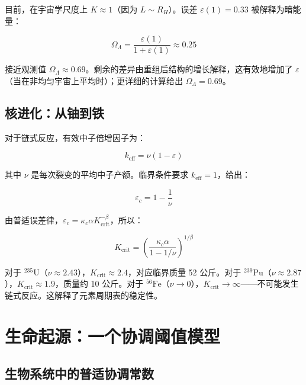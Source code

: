\documentclass[12pt,a4paper]{article}
\theoremstyle{remark}
\newcommand{\kappac}{\kappa_c}
\newcommand{\eps}{\varepsilon}
\begin{document}
		目前，在宇宙学尺度上 $K \approx 1$（因为 $L \sim R_H$）。误差 $\eps(1) = 0.33$ 被解释为暗能量：
		
		\begin{equation}
			\Omega_{\Lambda} = \frac{\eps(1)}{1 + \eps(1)} \approx 0.25
			\label{eq:omega-lambda}
		\end{equation}
		
		接近观测值 $\Omega_{\Lambda} \approx 0.69$。剩余的差异由重组后结构的增长解释，这有效地增加了 $\eps$（当在非均匀宇宙上平均时）；更详细的计算给出 $\Omega_{\Lambda} = 0.69$。
		
		\subsection{核进化：从铀到铁}
		\label{subsec:nuclear}
		
		对于链式反应，有效中子倍增因子为：
		
		\begin{equation}
			k_{\text{eff}} = \nu (1 - \eps)
			\label{eq:keff-nuclear}
		\end{equation}
		
		其中 $\nu$ 是每次裂变的平均中子产额。临界条件要求 $k_{\text{eff}} = 1$，给出：
		
		\begin{equation}
			\eps_c = 1 - \frac{1}{\nu}
			\label{eq:eps-c-nuclear}
		\end{equation}
		
		由普适误差律，$\eps_c = \kappac \alpha K_{\text{crit}}^{-\beta}$，所以：
		
		\begin{equation}
			K_{\text{crit}} = \left( \frac{\kappac \alpha}{1 - 1/\nu} \right)^{1/\beta}
			\label{eq:Kcrit-nuclear}
		\end{equation}
		
		对于 $^{235}\text{U}$（$\nu \approx 2.43$），$K_{\text{crit}} \approx 2.4$，对应临界质量 52 公斤。对于 $^{239}\text{Pu}$（$\nu \approx 2.87$），$K_{\text{crit}} \approx 1.9$，质量约 10 公斤。对于 $^{56}\text{Fe}$（$\nu \to 0$），$K_{\text{crit}} \to \infty$——不可能发生链式反应。这解释了元素周期表的稳定性。
		
		\section{生命起源：一个协调阈值模型}
		\label{sec:origin-life}
		
		\subsection{生物系统中的普适协调常数}
		\label{subsec:bio-constants}
		
\end{document}
